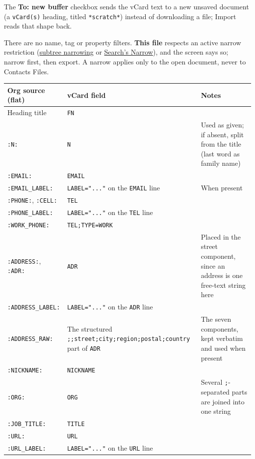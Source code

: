 \documentclass[11pt]{article}
\begin{document}
The \textbf{To: new buffer} checkbox sends the vCard text to a new unsaved document (a \texttt{vCard(s)} heading, titled \texttt{*scratch*}) instead of downloading a file; Import reads that shape back.

There are no name, tag or property filters. \textbf{This file} respects an active narrow restriction (\hyperref[sec:org4bc1b50]{subtree narrowing} or \hyperref[sec:org22ae446]{Search's Narrow}), and the screen says so; narrow first, then export. A narrow applies only to the open document, never to Contacts Files.

\begin{center}
\begin{tabular}{lll}
Org source (flat) & vCard field & Notes\\[0pt]
\hline
Heading title & \texttt{FN} & \\[0pt]
\texttt{:N:} & \texttt{N} & Used as given; if absent, split from the title (last word as family name)\\[0pt]
\texttt{:EMAIL:} & \texttt{EMAIL} & \\[0pt]
\texttt{:EMAIL\_LABEL:} & \texttt{LABEL="..."} on the \texttt{EMAIL} line & When present\\[0pt]
\texttt{:PHONE:}, \texttt{:CELL:} & \texttt{TEL} & \\[0pt]
\texttt{:PHONE\_LABEL:} & \texttt{LABEL="..."} on the \texttt{TEL} line & \\[0pt]
\texttt{:WORK\_PHONE:} & \texttt{TEL;TYPE=WORK} & \\[0pt]
\texttt{:ADDRESS:}, \texttt{:ADR:} & \texttt{ADR} & Placed in the street component, since an address is one free-text string here\\[0pt]
\texttt{:ADDRESS\_LABEL:} & \texttt{LABEL="..."} on the \texttt{ADR} line & \\[0pt]
\texttt{:ADDRESS\_RAW:} & The structured \texttt{;;street;city;region;postal;country} part of \texttt{ADR} & The seven components, kept verbatim and used when present\\[0pt]
\texttt{:NICKNAME:} & \texttt{NICKNAME} & \\[0pt]
\texttt{:ORG:} & \texttt{ORG} & Several \texttt{;}-separated parts are joined into one string\\[0pt]
\texttt{:JOB\_TITLE:} & \texttt{TITLE} & \\[0pt]
\texttt{:URL:} & \texttt{URL} & \\[0pt]
\texttt{:URL\_LABEL:} & \texttt{LABEL="..."} on the \texttt{URL} line & \\[0pt]

\end{tabular}
\end{center}
\end{document}
